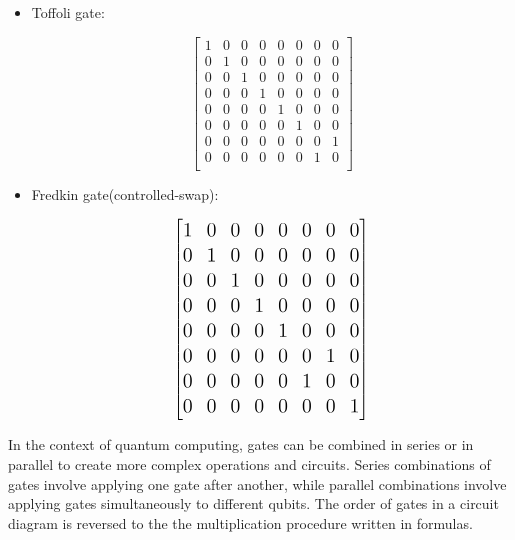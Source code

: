 \documentclass[inscr,ack,preface]{diphdthesis}
\begin{document}
\begin{itemize}
\item Toffoli gate:
    \begin{center}
    \Large
\[\begin{bmatrix}
        1 & 0 & 0 & 0 & 0 & 0 & 0 & 0 \\
        0 & 1 & 0 & 0 & 0 & 0 & 0 & 0 \\
        0 & 0 & 1 & 0 & 0 & 0 & 0 & 0 \\
        0 & 0 & 0 & 1 & 0 & 0 & 0 & 0 \\
        0 & 0 & 0 & 0 & 1 & 0 & 0 & 0 \\
        0 & 0 & 0 & 0 & 0 & 1 & 0 & 0 \\
        0 & 0 & 0 & 0 & 0 & 0 & 0 & 1 \\
        0 & 0 & 0 & 0 & 0 & 0 & 1 & 0 \\
    \end{bmatrix}\]    
    \normalsize
    \end{center}
    \item Fredkin gate(controlled-swap):
    \begin{center}

\[    \Large\begin{bmatrix}
        1 & 0 & 0 & 0 & 0 & 0 & 0 & 0 \\
        0 & 1 & 0 & 0 & 0 & 0 & 0 & 0 \\
        0 & 0 & 1 & 0 & 0 & 0 & 0 & 0 \\
        0 & 0 & 0 & 1 & 0 & 0 & 0 & 0 \\
        0 & 0 & 0 & 0 & 1 & 0 & 0 & 0 \\
        0 & 0 & 0 & 0 & 0 & 0 & 1 & 0 \\
        0 & 0 & 0 & 0 & 0 & 1 & 0 & 0 \\
        0 & 0 & 0 & 0 & 0 & 0 & 0 & 1 \\
    \end{bmatrix}\]    
\normalsize
\end{center}
\end{itemize}

In the context of quantum computing, gates can be combined in series or in parallel to create more complex operations and circuits. Series combinations of gates involve applying one gate after another, while parallel combinations involve applying gates simultaneously to different \acrshort{qubit}s. The order of gates in a circuit diagram is reversed to the the multiplication procedure written in formulas. 
\end{document}
